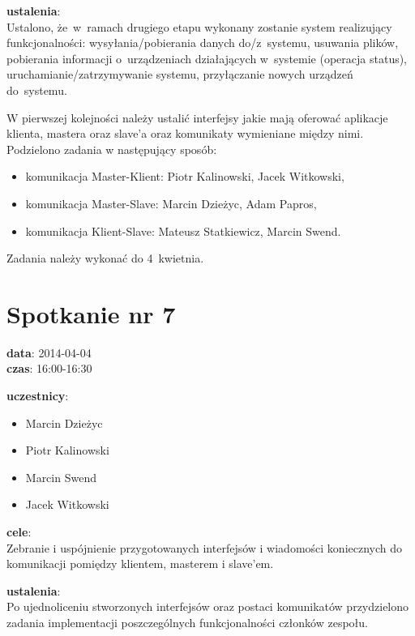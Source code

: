 \vspace{5mm}
\noindent
\textbf{ustalenia}: \\
Ustalono, że~w~ramach drugiego etapu wykonany zostanie system realizujący
funkcjonalności: wysyłania/pobierania danych do/z~systemu, usuwania plików,
pobierania informacji o~urządzeniach działających w~systemie (operacja status),
uruchamianie/zatrzymywanie systemu, przyłączanie nowych urządzeń do~systemu.

\vspace{5mm}
W pierwszej kolejności należy ustalić interfejsy jakie mają oferować aplikacje
klienta, mastera oraz slave'a oraz komunikaty wymieniane między nimi.
Podzielono zadania w następujący sposób:
\begin{itemize}
	\item komunikacja Master-Klient: Piotr Kalinowski, Jacek Witkowski,
	\item komunikacja Master-Slave: Marcin Dzieżyc, Adam Papros,
	\item komunikacja Klient-Slave: Mateusz Statkiewicz, Marcin Swend.
\end{itemize}

\vspace{5mm}
Zadania należy wykonać do 4~kwietnia.


\section[Spotkanie nr 7][Spotkanie nr 7]{Spotkanie nr 7}

\noindent
\textbf{data}: 2014-04-04 \\
\textbf{czas}: 16:00-16:30

\vspace{5mm}
\noindent
\textbf{uczestnicy}:
\begin{itemize}
	\item Marcin Dzieżyc
	\item Piotr Kalinowski
	\item Marcin Swend
	\item Jacek Witkowski
\end{itemize}

\vspace{5mm}
\noindent
\textbf{cele}: \\
Zebranie i uspójnienie przygotowanych interfejsów i wiadomości koniecznych
do komunikacji pomiędzy klientem, masterem i slave'em.

\vspace{5mm}
\noindent
\textbf{ustalenia}: \\
Po ujednoliceniu stworzonych interfejsów oraz postaci komunikatów
przydzielono zadania implementacji poszczególnych funkcjonalności
członków zespołu.

